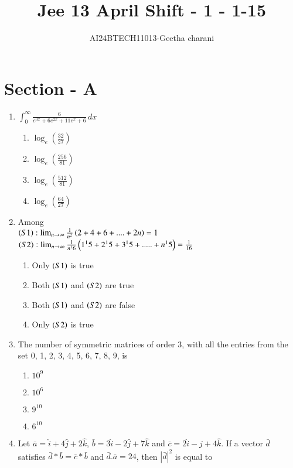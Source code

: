 \documentclass[journal,12pt,onecolumn]{IEEEtran}
\theoremstyle{remark}
\begin{document}

\vspace{3cm}

\title{Jee 13 April Shift - 1 - 1-15}
\author{AI24BTECH11013-Geetha charani}
\maketitle
\bigskip

\renewcommand{\thefigure}{\theenumi}
\renewcommand{\thetable}{\theenumi}
\section{Section - A}
\begin{enumerate}
\item $\int_0^{\infty} \frac{6}{e^{3x} + 6e^{2x} + 11e^{x} + 6} \, dx$
\begin{enumerate}
    \item $\log_e(\frac{32}{27})$
    \item $\log_e(\frac{256}{81})$
    \item $\log_e(\frac{512}{81})$
    \item $\log_e(\frac{64}{27})$
\end{enumerate}
\item Among\\
$ \left(S1\right) : \lim_{n \to \infty} \frac{1}{n^2} \left(2+4+6+....+2n\right) = 1$\\
$\left(S2\right) : \lim_{n \to \infty} \frac{1}{n^16} \left(1^15 +2^15 +3^15 +.....+ n^15\right) = \frac{1}{16}$
\begin{enumerate}
    \item Only $\left(S1\right)$ is true
    \item Both $\left(S1\right)$ and $\left(S2\right)$ are true 
    \item Both $\left(S1\right)$ and $\left(S2\right)$ are false
    \item Only $\left(S2\right)$ is true
\end{enumerate}
\item The number of symmetric matrices of order 3, with all the entries from the set {0, 1, 2, 3, 4, 5, 6, 7, 8, 9}, is
\begin{enumerate}
    \item $10^9$
    \item $10^6$
    \item $9^{10}$
    \item $6^{10}$
\end{enumerate}
\item Let $\bar{a} = \hat{i} + 4\hat{j} +2\hat{k}$, $\bar{b} = 3\hat{i}-2\hat{j}+7\hat{k}$ and $\bar{c} = 2\hat{i}-\hat{j}+4\hat{k}$. If a vector $\bar{d}$ satisfies $\bar{d}*\bar{b} = \bar{c}*\bar{b}$ and $\bar{d}.\bar{a}=24$, then $|\bar{d}|^2$ is equal to 

\end{enumerate}
\end{document}
